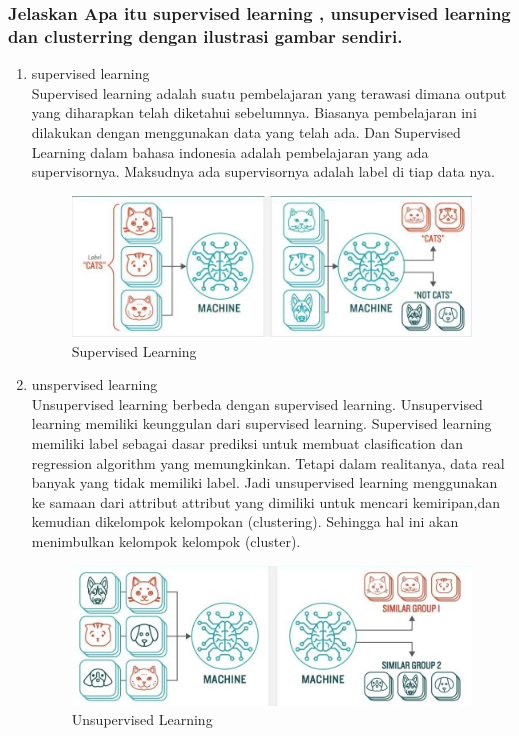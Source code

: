 \subsubsection{Jelaskan Apa itu supervised learning , unsupervised learning dan clusterring dengan ilustrasi gambar sendiri.}
\begin{enumerate}
\item supervised learning
\hfill\\
Supervised learning adalah suatu pembelajaran yang terawasi dimana output yang diharapkan telah diketahui sebelumnya. Biasanya pembelajaran ini dilakukan dengan menggunakan data yang telah ada. Dan Supervised Learning dalam bahasa indonesia adalah pembelajaran yang ada supervisornya. Maksudnya  ada supervisornya adalah label di tiap data nya. 
\begin{figure}[H]
    \includegraphics[width=12cm]{figures/1174077/2/sl.png}
    \centering
    \caption{Supervised Learning}
\end{figure}

\item unspervised learning
\hfill\\
Unsupervised learning berbeda dengan supervised learning. Unsupervised learning memiliki keunggulan dari supervised learning. Supervised learning memiliki label sebagai dasar prediksi untuk membuat clasification dan regression algorithm yang memungkinkan. Tetapi dalam realitanya, data real banyak yang tidak memiliki label. Jadi unsupervised learning menggunakan ke samaan dari attribut attribut yang dimiliki untuk mencari kemiripan,dan kemudian dikelompok kelompokan (clustering). Sehingga hal ini akan menimbulkan kelompok kelompok (cluster). 
\begin{figure}[H]
    \includegraphics[width=12cm]{figures/1174077/2/ul.png}
    \centering
    \caption{Unsupervised Learning}
\end{figure}


\end{enumerate}
